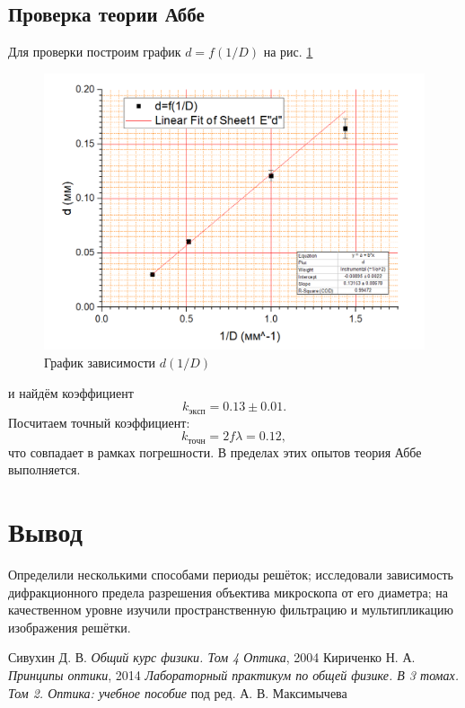 \documentclass[a4paper]{article}
\begin{document}
\subsection{Проверка теории Аббе}

Для проверки построим график $ d = f(1/D) $ на рис. \ref{fig:screenshot4}
\begin{figure}[tb]
	\centering
	\includegraphics[width=0.8\linewidth]{Screenshot_4}
	\caption{График зависимости $d(1/D)$}
	\label{fig:screenshot4}
\end{figure}
и найдём коэффициент $$ k_{эксп} = 0.13\pm 0.01. $$ Посчитаем точный коэффициент: $$ k_{точн} = 2 f \lambda = 0.12, $$ что совпадает в рамках погрешности. В пределах этих опытов теория Аббе выполняется.

\section{Вывод}

Определили несколькими способами периоды решёток; исследовали зависимость дифракционного предела разрешения объектива микроскопа от его диаметра; на качественном уровне изучили пространственную фильтрацию и мультипликацию изображения решётки.

\begin{thebibliography}{9}
	 Сивухин Д. В. \emph{Общий курс физики. Том 4 Оптика}, 2004
	 Кириченко Н. А. \emph{Принципы оптики}, 2014
	 \emph{Лабораторный практикум по общей физике. В 3 томах. Том 2. Оптика: учебное пособие} под ред. А. В. Максимычева
\end{thebibliography}
\end{document}
